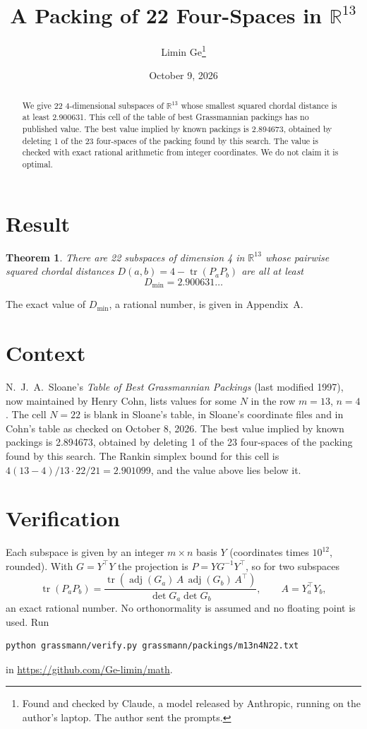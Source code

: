 \documentclass[11pt,a4paper]{article}
\title{A Packing of 22 Four-Spaces in $\mathbb{R}^{13}$}
\author{Limin Ge\thanks{Found and checked by Claude, a model released by Anthropic, running on the author's laptop. The author sent the prompts.}}
\date{October 9, 2026}
\newtheorem*{theorem}{Theorem}
\begin{document}
\maketitle
\begin{abstract}
We give 22 4-dimensional subspaces of $\mathbb{R}^{13}$ whose smallest squared chordal distance is at least 2.900631. This cell of the table of best Grassmannian packings has no published value. The best value implied by known packings is 2.894673, obtained by deleting 1 of the 23 four-spaces of the packing found by this search. The value is checked with exact rational arithmetic from integer coordinates. We do not claim it is optimal.
\end{abstract}

\section{Result}
\begin{theorem}
There are 22 subspaces of dimension 4 in $\mathbb{R}^{13}$ whose pairwise squared chordal distances $D(a,b) = 4 - \operatorname{tr}(P_aP_b)$ are all at least
\[ D_{\min} = 2.900631\ldots \]
\end{theorem}
The exact value of $D_{\min}$, a rational number, is given in Appendix~A.


\section{Context}
N.~J.~A.~Sloane's \emph{Table of Best Grassmannian Packings} (last modified 1997), now maintained by Henry Cohn, lists values for some $N$ in the row $m=13$, $n=4$. The cell $N=22$ is blank in Sloane's table, in Sloane's coordinate files and in Cohn's table as checked on October 8, 2026. The best value implied by known packings is 2.894673, obtained by deleting 1 of the 23 four-spaces of the packing found by this search. The Rankin simplex bound for this cell is $4(13-4)/13\cdot 22/21 = 2.901099$, and the value above lies below it.


\section{Verification}
Each subspace is given by an integer $m\times n$ basis $Y$ (coordinates times $10^{12}$, rounded). With $G=Y^\top Y$ the projection is $P=YG^{-1}Y^\top$, so for two subspaces
\[ \operatorname{tr}(P_aP_b)=\frac{\operatorname{tr}(\operatorname{adj}(G_a)\,A\,\operatorname{adj}(G_b)\,A^\top)}{\det G_a\det G_b},\qquad A=Y_a^\top Y_b, \]
an exact rational number. No orthonormality is assumed and no floating point is used. Run
\begin{verbatim}
python grassmann/verify.py grassmann/packings/m13n4N22.txt
\end{verbatim}
in \url{https://github.com/Ge-limin/math}.
\end{document}
